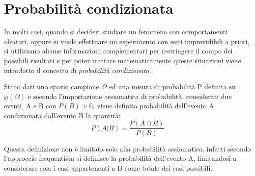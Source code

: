 \documentclass[a4paper,12pt, oneside]{book}
\begin{document}
\section{Probabilità condizionata}
In molti casi, quando si desideri studiare un fenomeno con comportamenti aleatori, oppure si vuole effettuare
un esperimento con esiti imprevidibili a priori, si utilizzano alcune informazioni complementari per restringere 
il campo dei possibili risultati e per poter trattare matematicamente queste situazioni viene introdotto
il concetto di \emph{probabilità condizionata}.

\begin{definizione}
Siano dati uno spazio campione $\Omega$ ed una misura di probabilità P definita su $\wp(\Omega)$ e
secondo l’impostazione assiomatica di probabilità, considerati due eventi, A e B con $P(B)>0$,
viene definita  probabilità dell'evento A condizionata dall'evento B la quantità:
\[P(A|B) = \frac{P(A\cap B)}{P(B)} \]
\end{definizione}
Questa definizione non è limitata solo alla probabilità assiomatica, infatti secondo l'approccio frequentista 
si definisce la probabilità dell'evento A, limitandosi a considerare solo i casi appartenenti a B come totale dei casi possibili.
\end{document}
